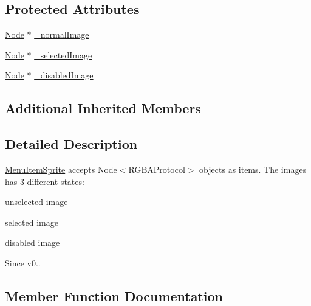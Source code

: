 \subsection*{Protected Attributes}
\begin{DoxyCompactItemize}
\item 
\hyperlink{classNode}{Node} $\ast$ \hyperlink{classMenuItemSprite_ab3c368fb04937be8da28053aab3a7c06}{\+\_\+normal\+Image}
\item 
\hyperlink{classNode}{Node} $\ast$ \hyperlink{classMenuItemSprite_ad962f8b01a3245d8bacf921ae70674aa}{\+\_\+selected\+Image}
\item 
\hyperlink{classNode}{Node} $\ast$ \hyperlink{classMenuItemSprite_a3a1b984ff13527e8292736194e13cd2e}{\+\_\+disabled\+Image}
\end{DoxyCompactItemize}
\subsection*{Additional Inherited Members}


\subsection{Detailed Description}
\hyperlink{classMenuItemSprite}{Menu\+Item\+Sprite} accepts Node$<$\+R\+G\+B\+A\+Protocol$>$ objects as items. The images has 3 different states\+: 


\begin{DoxyItemize}
\item unselected image
\item selected image
\item disabled image
\end{DoxyItemize}

\begin{DoxySince}{Since}
v0.. 
\end{DoxySince}


\subsection{Member Function Documentation}
\mbox{\label{classMenuItemSprite_ace4cc0187ff161f1fc3b2d0877b5b00f}} 
